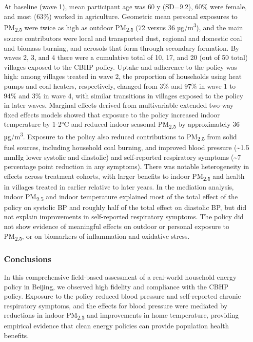 \documentclass[
  letterpaper,
  DIV=11,
  numbers=noendperiod]{scrartcl}
\begin{document}
At baseline (wave 1), mean participant age was 60 y (SD=9.2), 60\% were
female, and most (63\%) worked in agriculture. Geometric mean personal
exposures to PM\textsubscript{2.5} were twice as high as outdoor
PM\textsubscript{2.5} (72 versus 36 µg/m\textsuperscript{3}), and the
main source contributors were local and transported dust, regional and
domestic coal and biomass burning, and aerosols that form through
secondary formation. By waves 2, 3, and 4 there were a cumulative total
of 10, 17, and 20 (out of 50 total) villages exposed to the CBHP policy.
Uptake and adherence to the policy was high: among villages treated in
wave 2, the proportion of households using heat pumps and coal heaters,
respectively, changed from 3\% and 97\% in wave 1 to 94\% and 3\% in
wave 4, with similar transitions in villages exposed to the policy in
later waves. Marginal effects derived from multivariable extended
two-way fixed effects models showed that exposure to the policy
increased indoor temperature by 1-2°C and reduced indoor seasonal
PM\textsubscript{2.5} by approximately 36 µg/m\textsuperscript{3}.
Exposure to the policy also reduced contributions to
PM\textsubscript{2.5} from solid fuel sources, including household coal
burning, and improved blood pressure (\textasciitilde1.5 mmHg lower
systolic and diastolic) and self-reported respiratory symptoms
(\textasciitilde7 percentage point reduction in any symptoms). There was
notable heterogeneity in effects across treatment cohorts, with larger
benefits to indoor PM\textsubscript{2.5} and health in villages treated
in earlier relative to later years. In the mediation analysis, indoor
PM\textsubscript{2.5} and indoor temperature explained most of the total
effect of the policy on systolic BP and roughly half of the total effect
on diastolic BP, but did not explain improvements in self-reported
respiratory symptoms. The policy did not show evidence of meaningful
effects on outdoor or personal exposure to PM\textsubscript{2.5}, or on
biomarkers of inflammation and oxidative stress.

\hypertarget{conclusions}{%
\subsubsection*{Conclusions}\label{conclusions}}

In this comprehensive field-based assessment of a real-world household
energy policy in Beijing, we observed high fidelity and compliance with
the CBHP policy. Exposure to the policy reduced blood pressure and
self-reported chronic respiratory symptoms, and the effects for blood
pressure were mediated by reductions in indoor PM\textsubscript{2.5} and
improvements in home temperature, providing empirical evidence that
clean energy policies can provide population health benefits.
\end{document}

